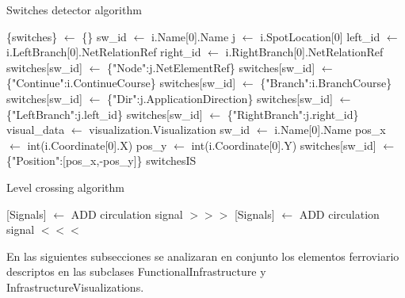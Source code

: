     \begin{algorithm}
            \caption{Switches detector algorithm}
            \label{alg:switches}
            \begin{algorithmic}
                \STATE \{switches\} $\gets$ \{\}
                            \STATE sw\_id $\gets$ i.Name[0].Name
                            \STATE j $\gets$ i.SpotLocation[0]
                            \STATE left\_id $\gets$ i.LeftBranch[0].NetRelationRef
                            \STATE right\_id $\gets$ i.RightBranch[0].NetRelationRef
                            \STATE switches[sw\_id] $\gets$ \{"Node":j.NetElementRef\}
                            \STATE switches[sw\_id] $\gets$ \{"Continue":i.ContinueCourse\}
                            \STATE switches[sw\_id] $\gets$ \{"Branch":i.BranchCourse\}
                            \STATE switches[sw\_id] $\gets$ \{"Dir":j.ApplicationDirection\}
                            \STATE switches[sw\_id] $\gets$ \{"LeftBranch":j.left\_id\}
                            \STATE switches[sw\_id] $\gets$ \{"RightBranch":j.right\_id\}
                        \ENDIF
                    \ENDFOR
                \ENDIF
                \STATE visual\_data $\gets$ visualization.Visualization
                        \STATE sw\_id $\gets$ i.Name[0].Name
                            \STATE pos\_x $\gets$ int(i.Coordinate[0].X)
                            \STATE pos\_y $\gets$ int(i.Coordinate[0].Y)
                            \STATE switches[sw\_id] $\gets$ \{"Position":[pos\_x,-pos\_y]\}
                        \ENDIF 
                    \ENDFOR
                \ENDIF
            \RETURN switchesIS
            \end{algorithmic}
        \end{algorithm}



    \begin{algorithm}[hbt!]
        \caption{Level crossing algorithm}\label{alg:LC}
        \DontPrintSemicolon
        \SetNoFillComment
        \LinesNotNumbered 
        {
            [Signals] $\gets$ ADD circulation signal $>>>$\;
            [Signals] $\gets$ ADD circulation signal $<<<$\;
        }
        \KwResult{[Signals]} 
    \end{algorithm}



    
    
    En las siguientes subsecciones se analizaran en conjunto los elementos ferroviario descriptos en las subclases FunctionalInfrastructure y InfrastructureVisualizations.
